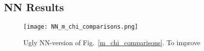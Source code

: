 \subsection{NN Results}
\begin{figure}
    \centering
    \texttt{[image: NN\_m\_chi\_comparisons.png]}
    \caption{Ugly NN-version of Fig.~\ref{m_chi_comparisons}. To improve}
        \label{NN_m_chi_comparisons}
\end{figure}